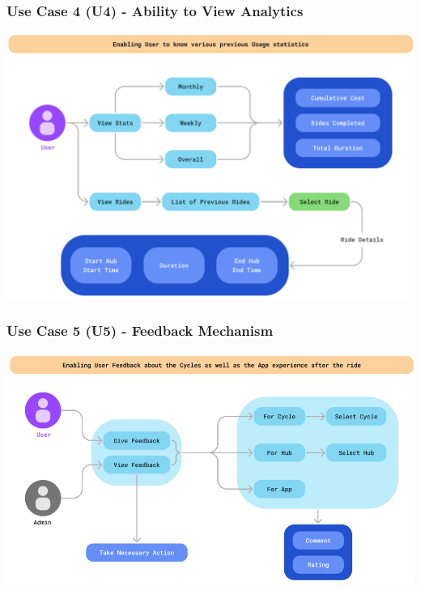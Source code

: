 \documentclass[11pt]{article}
\begin{document}
\subsubsection{Use Case 4 (U4) - Ability to View Analytics}
\begin{center}
  \includegraphics[scale=0.5]{../srs/usecase-4.png}
\end{center}

\subsubsection{Use Case 5 (U5) - Feedback Mechanism}
\begin{center}
  \includegraphics[scale=0.5]{../srs/usecase-5.png}
\end{center}
\end{document}
